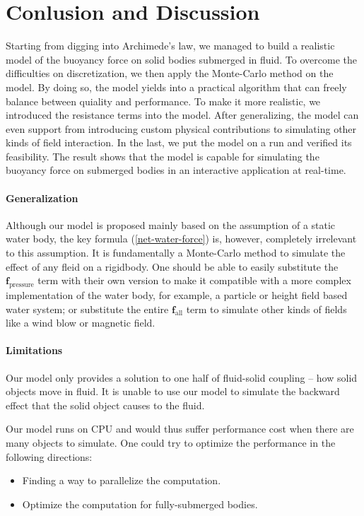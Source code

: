 \section{Conlusion and Discussion}

Starting from digging into Archimede's law, we managed to build a realistic model of the buoyancy force on solid bodies submerged in fluid.
To overcome the difficulties on discretization, we then apply the Monte-Carlo method on the model.
By doing so, the model yields into a practical algorithm that can freely balance between quiality and performance.
To make it more realistic, we introduced the resistance terms into the model.
After generalizing, the model can even support from introducing custom physical contributions to simulating other kinds of field interaction.
In the last, we put the model on a run and verified its feasibility.
The result shows that the model is capable for simulating the buoyancy force on submerged bodies in an interactive application at real-time.

\paragraph*{Generalization}

Although our model is proposed mainly based on the assumption of a static water body,
the key formula (\ref{net-water-force}) is, however, completely irrelevant to this assumption.
It is fundamentally a Monte-Carlo method to simulate the effect of any fleid on a rigidbody.
One should be able to easily substitute the $\mathbf{f}_{\text{pressure}}$ term with their own version to make it compatible with a more complex implementation of the water body, for example, a particle or height field based water system; or substitute the entire $\mathbf{f}_{\text{all}}$ term to simulate other kinds of fields like a wind blow or magnetic field.

\paragraph*{Limitations}

Our model only provides a solution to one half of fluid-solid coupling -- how solid objects move in fluid.
It is unable to use our model to simulate the backward effect that the solid object causes to the fluid.

Our model runs on CPU and would thus suffer performance cost when there are many objects to simulate.
One could try to optimize the performance in the following directions:
\begin{itemize}
	\item Finding a way to parallelize the computation.
	\item Optimize the computation for fully-submerged bodies.
\end{itemize}

